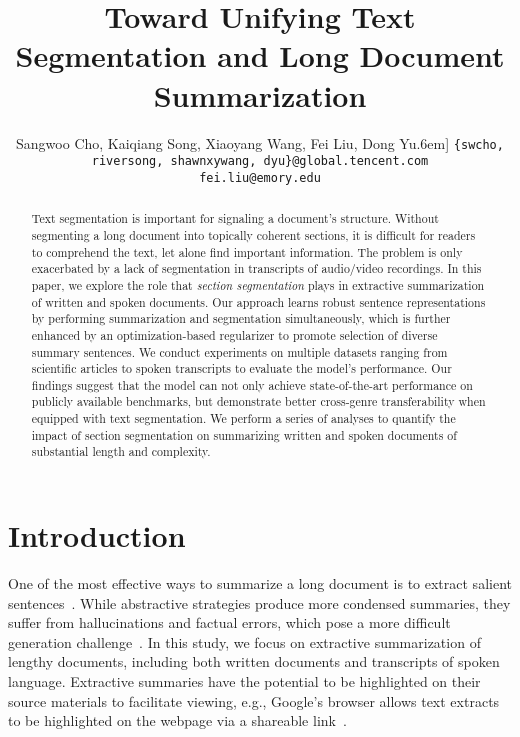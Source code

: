 \documentclass[11pt]{article}
\title{Toward Unifying Text Segmentation and Long Document Summarization}
\author{Sangwoo Cho, Kaiqiang Song, Xiaoyang Wang, Fei Liu, Dong Yu\0.6em]
\texttt{\{swcho, riversong, shawnxywang, dyu\}@global.tencent.com}\\ 
\texttt{fei.liu@emory.edu}
}
\begin{document}
\maketitle
\begin{abstract}


Text segmentation is important for signaling a document's structure.
Without segmenting a long document into topically coherent sections,
it is difficult for readers to comprehend the text, let alone find important information.
The problem is only exacerbated by a lack of segmentation in transcripts of audio/video recordings. 
In this paper, we explore the role that \emph{section segmentation} plays
in extractive summarization of written and spoken documents. 
Our approach learns robust sentence representations by performing summarization and segmentation simultaneously,
which is further enhanced by an optimization-based regularizer to promote selection of diverse summary sentences.
We conduct experiments on multiple datasets ranging from scientific articles to spoken transcripts to evaluate the model's performance.
Our findings suggest that the model can not only achieve state-of-the-art performance on publicly available benchmarks,
but demonstrate better cross-genre transferability when equipped with text segmentation.
We perform a series of analyses to quantify the impact of section segmentation on 
summarizing written and spoken documents of substantial length and complexity. 



\end{abstract}

\section{Introduction}


One of the most effective ways to summarize a long document is to extract salient sentences~\cite{goldstein-etal-2000-multi}.
While abstractive strategies produce more condensed summaries,
they suffer from hallucinations and factual errors,
which pose a more difficult generation challenge~\cite{lebanoff-etal-2020-understanding,goyal-durrett-2021-annotating}.
In this study, we focus on extractive summarization of lengthy documents,
including both written documents and transcripts of spoken language.
Extractive summaries have the potential to be highlighted on their source materials to facilitate viewing,
e.g., Google's browser allows text extracts to be highlighted on the webpage via a shareable link~\cite{HighlightedLinks:2021}.
\end{document}
